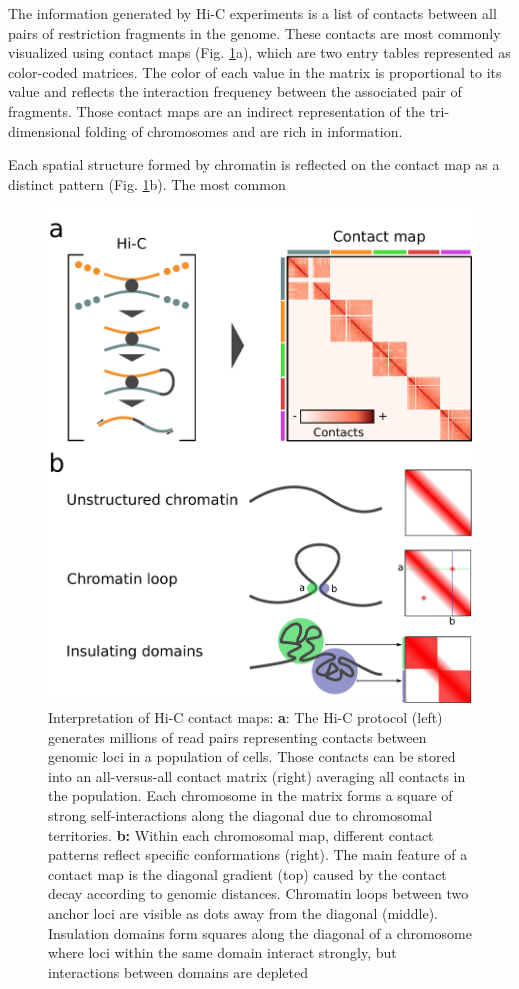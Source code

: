 The information generated by Hi-C experiments is a list of contacts between all pairs of restriction fragments in the genome. These contacts are most commonly visualized using contact maps (Fig. \ref{fig:01-02:hic}a), which are two entry tables represented as color-coded matrices. The color of each value in the matrix is proportional to its value and reflects the interaction frequency between the associated pair of fragments. Those contact maps are an indirect representation of the tri-dimensional folding of chromosomes and are rich in information.

Each spatial structure formed by chromatin is reflected on the contact map as a distinct pattern (Fig. \ref{fig:01-02:hic}b). The most common
\begin{figure}[b]
    \includegraphics[width=\textwidth]{"Parts/Part01/gfx/hic_interpretation.pdf"}
    \caption{Interpretation of Hi-C contact maps: \textbf{a}: The Hi-C protocol (left) generates millions of read pairs representing contacts between genomic loci in a population of cells. Those contacts can be stored into an all-versus-all contact matrix (right) averaging all contacts in the population. Each chromosome in the matrix forms a square of strong self-interactions along the diagonal due to chromosomal territories. \textbf{b:} Within each chromosomal map, different contact patterns reflect specific conformations (right). The main feature of a contact map is the diagonal gradient (top) caused by the contact decay according to genomic distances. Chromatin loops between two anchor loci are visible as dots away from the diagonal (middle). Insulation domains form squares along the diagonal of a chromosome where loci within the same domain interact strongly, but interactions between domains are depleted}
	\label{fig:01-02:hic}
\end{figure}

